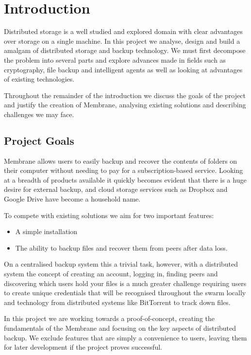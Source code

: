 \documentclass[11pt, a4paper, twoside]{report}
\begin{document}
\listoffigures

\chapter{Introduction}
Distributed storage is a well studied and explored domain with clear advantages over storage on a single machine. In this project we analyse, design and build a amalgam of distributed storage and backup technology. We must first decompose the problem into several parts and explore advances made in fields such as cryptography, file backup and intelligent agents as well as looking at advantages of existing technologies.

Throughout the remainder of the introduction we discuss the goals of the project and justify the creation of Membrane, analysing existing solutions and describing challenges we may face.

\section{Project Goals}

Membrane allows users to easily backup and recover the contents of folders on their computer without needing to pay for a subscription-based service. Looking at a breadth of products available it quickly becomes evident that there is a huge desire for external backup, and cloud storage services such as Dropbox and Google Drive have become a household name. \citep{dropbox2015popularity}

To compete with existing solutions we aim for two important features: 

\begin{itemize}
 \item A simple installation
 \item The ability to backup files and recover them from peers after data loss.
\end{itemize}

On a centralised backup system this a trivial task, however, with a distributed system the concept of creating an account, logging in, finding peers and discovering which users hold your files is a much greater challenge requiring users to create unique credentials that will be recognised throughout the swarm locally and technology from distributed systems like BitTorrent to track down files.

In this project we are working towards a proof-of-concept, creating the fundamentals of the Membrane and focusing on the key aspects of distributed backup. We exclude features that are simply a convenience to users, leaving them for later development if the project proves successful.
\end{document}
